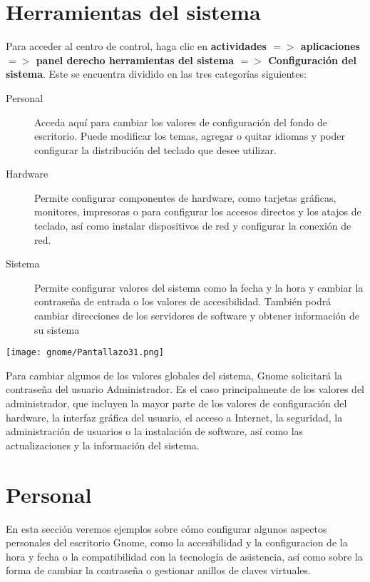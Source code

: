 \documentclass[12pt,letterpaper]{book}
\begin{document}
\section{Herramientas del sistema}
Para acceder al centro de control, haga clic en {\bf actividades $=>$ aplicaciones $=>$ panel derecho herramientas del sistema $=>$ Configuración del sistema}. Este se encuentra dividido en las tres categorías siguientes:
\begin{description}
\item[Personal] Acceda aquí para cambiar los valores de configuración del fondo de escritorio. Puede modificar los temas, agregar o quitar idiomas y poder configurar la distribución del teclado que desee utilizar.
\item[Hardware] Permite configurar componentes de hardware, como tarjetas gráficas, monitores, impresoras o para configurar los accesos directos y los atajos de teclado, así como instalar dispositivos de red y configurar la conexión de red.
\item[Sistema] Permite configurar valores del sistema como la fecha y la hora y cambiar
la contraseña de entrada o los valores de accesibilidad.
También podrá cambiar direcciones de los servidores de software y obtener información de su sistema 
\end{description}
\begin{center}
\texttt{[image: gnome/Pantallazo31.png]}\\
\end{center}
Para cambiar algunos de los valores globales del sistema, Gnome solicitará
la contraseña del usuario Administrador. Es el caso principalmente de los
valores del administrador, que incluyen la mayor parte de los valores de configuración
del hardware, la interfaz gráfica del usuario, el acceso a Internet, la seguridad, la
administración de usuarios o la instalación de software, así como las actualizaciones y
la información del sistema.
\section{Personal}
En esta sección veremos ejemplos sobre cómo configurar algunos aspectos personales del escritorio Gnome, como la accesibilidad y la configuracion de la hora y fecha o la compatibilidad con la tecnología de asistencia, así como sobre la forma de cambiar la contraseña o gestionar anillos de claves virtuales.
\end{document}
